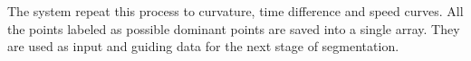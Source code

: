 \documentclass[a4paper,10pt]{IEEEconf}
\begin{document}
The system repeat this process to curvature, time difference and speed curves. All the points labeled as possible dominant points are saved into a single array. They are used as input and guiding data for the next stage of segmentation. 
\begin{figure}[]
\begin{minipage}[b]{0.5\linewidth}
	\centering

		

\end{minipage}
\end{figure}
\end{document}
